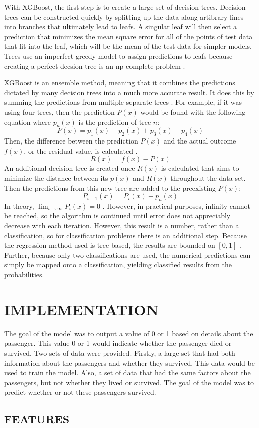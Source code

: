 \documentclass[12pt]{article}
\begin{document}
    With XGBoost, the first step is to create a large set of decision trees. Decision trees can be constructed quickly by splitting up the data along artibrary lines into branches that ultimately lead to leafs. A singular leaf will then select a prediction that minimizes the mean square error for all of the points of test data that fit into the leaf, which will be the mean of the test data for simpler models. Trees use an imperfect greedy model to assign predictions to leafs because creating a perfect decsion tree is an np-complete problem \cite{two}.

    XGBoost is an ensemble method, meaning that it combines the predictions dictated by many decision trees into a much more accurate result. It does this by summing the predictions from multiple separate trees \cite{three}. For example, if it was using four trees, then the prediction $P(x)$ would be found with the following equation where $p_{n}(x)$ is the prediction of tree $n$:
    \begin{equation}
      P(x) = p_{1}(x) + p_{2}(x) + p_{3}(x) + p_{4}(x)
    \end{equation}
    Then, the difference between the prediction $P(x)$ and the actual outcome $f(x)$, or the residual value, is calculated \cite{three}.
    \begin{equation}
      R(x) = f(x) - P(x)
    \end{equation}
    An additional decision tree is created once $R(x)$ is calculated that aims to minimize the distance between its $p(x)$
    and $R(x)$ throughout the data set. Then the predictions from this new tree are added to the preexisting $P(x)$:
      \begin{equation}
        P_{i+1}(x) = P_i(x) + p_n(x)
      \end{equation}
    In theory, $\lim_{i \to \infty} P_i(x) = 0$ \cite{mason2000boosting}. However, in practical purposes, infinity cannot be reached, so the algorithm is continued until error does not appreciably decrease with each iteration. However, this result is a number, rather than a classification, so for classification problems there is an additional step. Because the regression method used is tree based, the results are bounded on $[0,1]$ \cite{classificationexplanation}. Further, because only two classifications are used, the numerical predictions can simply be mapped onto a classification, yielding classified results from the probabilities.

  \section{IMPLEMENTATION}
    The goal of the model was to output a value of 0 or 1 based on details about the passenger. This value 0 or 1 would indicate whether the passenger died or survived. Two sets of data were provided. Firstly, a large set that had both information about the passengers and whether they survived. This data would be used to train the model. Also, a set of data that had the same factors about the passengers, but not whether they lived or survived. The goal of the model was to predict whether or not these passengers survived.
    \subsection{FEATURES}


    {}
    
  
\end{document}
